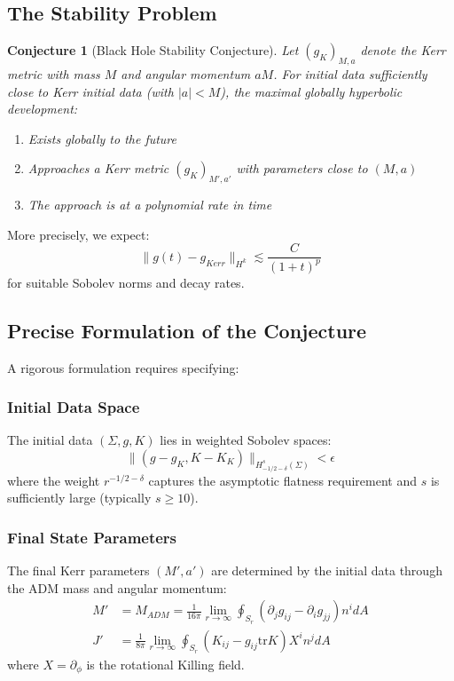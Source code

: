 \documentclass[12pt,a4paper]{article}
\newtheorem{conjecture}[theorem]{Conjecture}
\begin{document}
\subsection{The Stability Problem}

\begin{conjecture}[Black Hole Stability Conjecture]
Let $(g_K)_{M,a}$ denote the Kerr metric with mass $M$ and angular momentum $aM$. For initial data sufficiently close to Kerr initial data (with $|a| < M$), the maximal globally hyperbolic development:
\begin{enumerate}
    \item Exists globally to the future
    \item Approaches a Kerr metric $(g_K)_{M',a'}$ with parameters close to $(M, a)$
    \item The approach is at a polynomial rate in time
\end{enumerate}
\end{conjecture}

More precisely, we expect:
\begin{equation}
\|g(t) - g_{Kerr}\|_{H^k} \lesssim \frac{C}{(1+t)^p}
\end{equation}
for suitable Sobolev norms and decay rates.

\subsection{Precise Formulation of the Conjecture}

A rigorous formulation requires specifying:

\subsubsection{Initial Data Space}
The initial data $(\Sigma, g, K)$ lies in weighted Sobolev spaces:
\begin{equation}
\|(g - g_K, K - K_K)\|_{H^s_{-1/2-\delta}(\Sigma)} < \epsilon
\end{equation}
where the weight $r^{-1/2-\delta}$ captures the asymptotic flatness requirement and $s$ is sufficiently large (typically $s \geq 10$).

\subsubsection{Final State Parameters}
The final Kerr parameters $(M', a')$ are determined by the initial data through the ADM mass and angular momentum:
\begin{align}
M' &= M_{ADM} = \frac{1}{16\pi}\lim_{r\to\infty}\oint_{S_r}(\partial_j g_{ij} - \partial_i g_{jj})n^i dA \\
J' &= \frac{1}{8\pi}\lim_{r\to\infty}\oint_{S_r}(K_{ij} - g_{ij}\text{tr}K)X^i n^j dA
\end{align}
where $X = \partial_\phi$ is the rotational Killing field.
\end{document}
